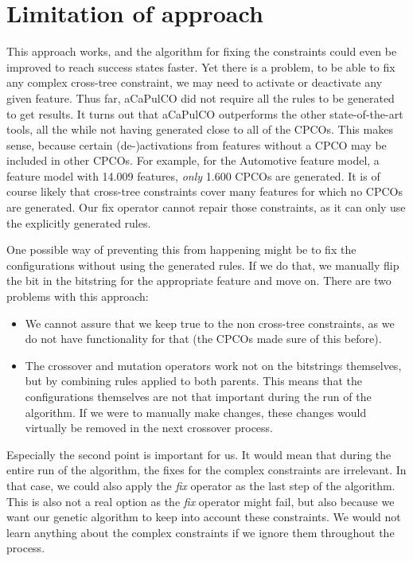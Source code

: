 \section{Limitation of approach}
This approach works, and the algorithm for fixing the constraints could even be
improved to reach success states faster. Yet there is a problem, to be able to
fix any complex cross-tree constraint, we may need to activate or deactivate any
given feature. Thus far, aCaPulCO did not require all the rules to be generated
to get results. It turns out that aCaPulCO outperforms the other
state-of-the-art tools, all the while not having generated close to all of the
CPCOs. This makes sense, because certain (de-)activations from features without a
CPCO may be included in other CPCOs. For example, for the Automotive feature model,
a feature model with 14.009 features, \emph{only} 1.600 CPCOs are generated.
It is of course likely that cross-tree constraints cover many features for which no
CPCOs are generated. Our fix operator cannot repair those constraints,
as it can only use the explicitly generated rules.

One possible way of preventing this from happening might be to fix the
configurations without using the generated rules. If we do that, we manually flip
the bit in the bitstring for the appropriate feature and move on. There are two
problems with this approach:
\begin{itemize}
    \item We cannot assure that we keep true to the non cross-tree constraints, as
          we do not have functionality for that (the CPCOs made sure of this before).
    \item The crossover and mutation operators work not on the bitstrings themselves,
          but by combining rules applied to both parents. This means that the
          configurations themselves are not that important during the run of the
          algorithm. If we were to manually make changes, these changes would virtually
          be removed in the next crossover process.
\end{itemize}

Especially the second point is important for us. It would mean that during the entire
run of the algorithm, the fixes for the complex constraints are irrelevant. In that
case, we could also apply the \emph{fix} operator as the last step of the algorithm.
This is also not a real option as the \emph{fix} operator might fail, but also
because we want our genetic algorithm to keep into account these constraints. We
would not learn anything about the complex constraints if we ignore them throughout
the process.

